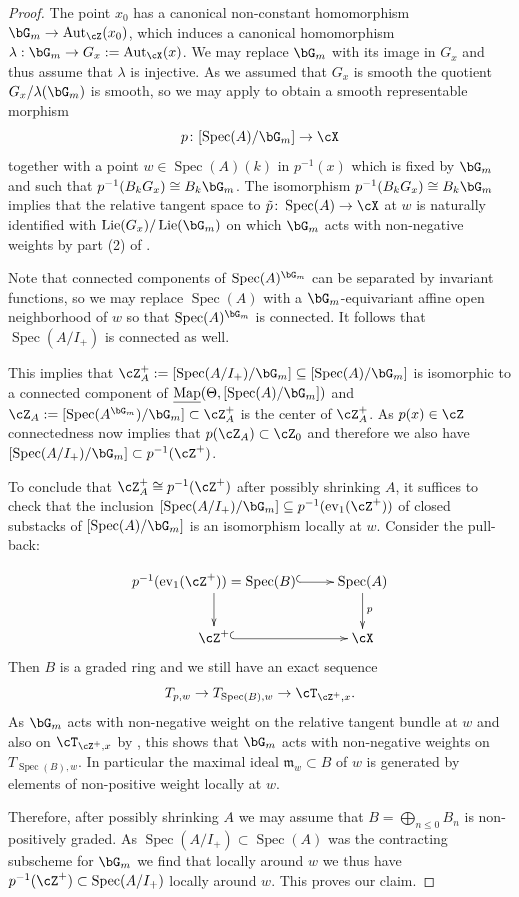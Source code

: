 \documentclass[a4paper]{amsart}
\numberwithin{equation}{section}
\theoremstyle{plain}
\theoremstyle{definition}
\DeclareMathOperator{\Spec}{Spec}
\DeclareMathOperator{\ev}{ev}
\DeclareMathOperator{\Aut}{Aut}
\newcommand{\uMap}{\underline{{\rm Map}}}
\newcommand{\co}{\colon}
\DeclareMathOperator{\Lie}{Lie}
\begin{document}
\begin{proof}
	The point $x_0$ has a canonical non-constant homomorphism $\bG_m \to \Aut_{\cZ}(x_0)$, which induces a canonical homomorphism $\lambda: \bG_m \to G_{x} := \Aut_{\cX}(x)$. We may replace $\bG_m$ with its image in $G_{x}$ and thus assume that $\lambda$ is injective. As we assumed that $G_x$ is smooth the quotient $G_{x} / \lambda(\bG_m)$ is smooth, so we may apply \cite[Thm.~1.2]{ahr}  to obtain a smooth representable morphism 
	$$ p \co [\Spec(A)/\bG_m] \to \cX$$
	together with a point $w\in \Spec(A)(k)$ in $p^{-1}(x)$ which is fixed by $\bG_m$ and such that $p^{-1}(B_k G_{x})\cong B_k \bG_m$. The isomorphism $p^{-1}(B_k G_{x})\cong B_k \bG_m$ implies that the relative tangent space to $\tilde{p} \co \Spec(A) \to \cX$ at $w$ is naturally identified with $\Lie(G_x) / \Lie(\bG_m)$ on which $\bG_m$ acts with non-negative weights by part (2) of .
	
	Note that connected components of $\Spec(A)^{\bG_m}$ can be separated by invariant functions, so we may replace $\Spec(A)$ with a $\bG_m$-equivariant affine open neighborhood of $w$ so that $\Spec(A)^{\bG_m}$ is connected. It follows that $\Spec(A/I_+)$ is connected as well.
	
	
	This implies that $\cZ^+_A:=[\Spec(A/I_+)/\bG_m]\subseteq [\Spec(A)/\bG_m]$ is isomorphic to a connected component of $\uMap(\Theta,[\Spec(A)/\bG_m])$ and $\cZ_A:=[\Spec(A^{\bG_m})/\bG_m]\subset \cZ^+_A$ is the center of $\cZ^+_A$. As $p(x)\in \cZ$ connectedness now implies that $p(\cZ_A)\subset \cZ_0$ and therefore we also have  $[\Spec(A/I_+)/\bG_m] \subset p^{-1}(\cZ^+)$.
	
	To conclude that $\cZ^+_A \cong p^{-1}(\cZ^+)$ after possibly shrinking $A$, it suffices to check that the inclusion $[\Spec(A / I_+)/\bG_m] \subseteq p^{-1}(\ev_1(\cZ^+))$ of closed substacks of $[\Spec(A)/\bG_m]$ is an isomorphism locally at $w$. Consider the pull-back:
	
	$$\xymatrix{
		p^{-1}(\ev_1(\cZ^+))=\Spec(B) \ar[d] \ar@{^(->}[r]& \Spec(A)\ar[d]^{p}\\
		\cZ^+\ar@{^(->}[r] & \cX
	}$$
	Then $B$ is a graded ring and we still have an exact sequence $$T_{p,w} \to T_{\Spec(B),w} \to \cT_{\cZ^+,x}.$$ As $\bG_m$ acts with non-negative weight on the relative tangent bundle at $w$ and also on $\cT_{\cZ^+,x}$ by  , this shows that $\bG_m$ acts with non-negative weights on $T_{\Spec(B),w}$. In particular the maximal ideal $\mathfrak{m}_{w} \subset B$ of $w$ is generated by elements of non-positive weight locally at $w$. 
	
	Therefore, after possibly shrinking $A$ we may assume that $B =\bigoplus_{n \leq 0} B_n$ is non-positively graded.  
	As $\Spec(A/I_+) \subset \Spec(A)$ was the contracting subscheme for $\bG_m$ we find that locally around $w$ we thus have  $p^{-1}(\cZ^+) \subset \Spec(A / I_+)$ locally around $w$. This proves our claim.
\end{proof}
\end{document}
